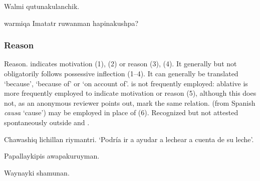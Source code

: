{%
{Walmi qutunakulanchik.}%
{}%
{}{}%

%
{ warmiqa \textquestiondown{}Imatatr ruwanman hapinakushpa?}%
{}%
{}{}%

\subsubsection{Reason }
Reason.  indicates motivation (1), (2) or reason (3), (4). It generally but not obligatorily follows possessive inflection (1--4). It can generally be translated `because', `because of' or `on account of'.  is not frequently employed: ablative  is more frequently employed to indicate motivation or reason (5), although this  does not, as an anonymous reviewer points out, mark the same relation.  (from Spanish \emph{causa} `cause') may be employed in place of  (6). Recognized but not attested spontaneously outside \AMV{} and \CH{}.

%
{Chawashiq lichillan riymantri.}%
{}%
%
{`Podr\'ia ir a ayudar a lechear a cuenta de su leche'.}%
{}{}%

%
{Papallaykipis awapakuruyman.}%
{}%
{}{}%

%
{Waynayki shamunan.}%
{}%
{}{}%

}
